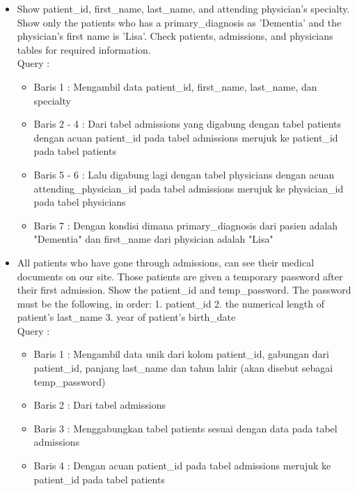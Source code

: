 \documentclass[]{article}
\begin{document}
\begin{itemize}
        \item Show patient\_id, first\_name, last\_name, and attending physician's specialty. Show only the patients who has a primary\_diagnosis as 'Dementia' and the physician's first name is 'Lisa'. Check patients, admissions, and physicians tables for required information.
        \\Query :
        
        \begin{itemize}
            \item Baris 1 : Mengambil data patient\_id, first\_name, last\_name, dan specialty
            \item Baris 2 - 4 : Dari tabel admissions yang digabung dengan tabel patients dengan acuan patient\_id pada tabel admissions merujuk ke patient\_id pada tabel patients
            \item Baris 5 - 6 : Lalu digabung lagi dengan tabel physicians dengan acuan attending\_physician\_id pada tabel admissions merujuk ke physician\_id pada tabel physicians
            \item Baris 7 : Dengan kondisi dimana primary\_diagnosis dari pasien adalah "Dementia" dan first\_name dari physician adalah "Lisa"
        \end{itemize}

        \item All patients who have gone through admissions, can see their medical documents on our site. Those patients are given a temporary password after their first admission. Show the patient\_id and temp\_password.
        The password must be the following, in order:
            1. patient\_id
            2. the numerical length of patient's last\_name
            3. year of patient's birth\_date
        \\Query :
        
        \begin{itemize}
            \item Baris 1 : Mengambil data unik dari kolom patient\_id, gabungan dari patient\_id, panjang last\_name dan tahun lahir (akan disebut sebagai temp\_password)
            \item Baris 2 : Dari tabel admissions
            \item Baris 3 : Menggabungkan tabel patients sesuai dengan data pada tabel admissions
            \item Baris 4 : Dengan acuan patient\_id pada tabel admissions merujuk ke patient\_id pada tabel patients
        \end{itemize}


\end{itemize}
\end{document}
